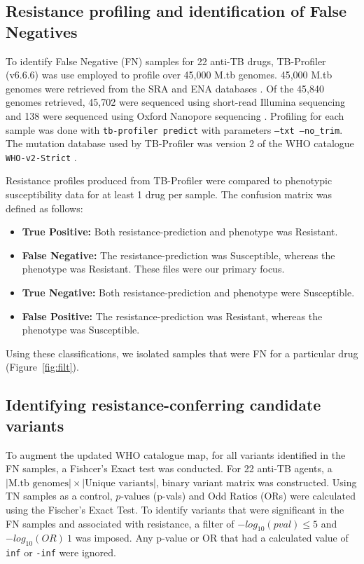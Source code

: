 \subsection{Resistance profiling and identification of False Negatives}
To identify False Negative (FN) samples for 22 anti-TB drugs, TB-Profiler (v6.6.6) \cite{phelan2019integrating} was use employed to profile over 45,000 M.tb genomes. 45,000 M.tb genomes were retrieved from the SRA and ENA databases \cite{sra_infra_2022, ena_infra_2024}. Of the 45,840 genomes retrieved, 45,702 were sequenced using short-read Illumina sequencing \cite{Bentley2008} and 138 were sequenced using Oxford Nanopore sequencing \cite{Jain2018}. Profiling for each sample was done with \texttt{tb-profiler predict} with parameters \texttt{--txt --no\_trim}. The mutation database used by TB-Profiler was version 2 of the WHO catalogue \texttt{WHO-v2-Strict} \cite{phelan2019integrating}. 

Resistance profiles produced from TB-Profiler were compared to phenotypic susceptibility data for at least 1 drug per sample. The confusion matrix was defined as follows:
\begin{itemize}
  \item \textbf{True Positive:} Both resistance-prediction and phenotype was Resistant.
  \item \textbf{False Negative:} The resistance-prediction was Susceptible, whereas the phenotype was Resistant. These files were our primary focus.
\item \textbf{True Negative:} Both resistance-prediction and phenotype were Susceptible.
\item \textbf{False Positive:} The resistance-prediction was Resistant, whereas the phenotype was Susceptible.
\end{itemize}

Using these classifications, we isolated samples that were FN for a particular drug (Figure~\ref{fig:filt}). 

\subsection{Identifying resistance-conferring candidate variants}
To augment the updated WHO catalogue map, for all variants identified in the FN samples, a Fishcer's Exact test was conducted. For 22 anti-TB agents, a $|\text{M.tb genomes}| \times |\text{Unique variants}|$, binary variant matrix was constructed. Using TN samples as a control, $p$-values (p-vals) and Odd Ratios (ORs) were calculated using the Fischer's Exact Test. To identify variants that were significant in the FN samples and associated with resistance, a filter of $-log_{10}(pval) \leq 5$ and $-log_{10}(OR) \> 1$ was imposed. Any p-value or OR that had a calculated value of \texttt{inf} or \texttt{-inf} were ignored.

